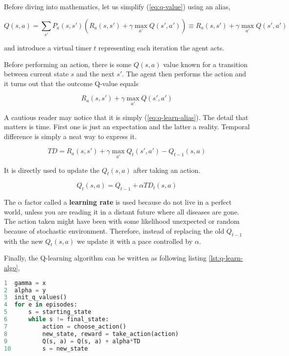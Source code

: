 Before diving into mathematics, let us simplify (\ref{eq:q-value}) using an alias,

\begin{equation}
    Q(s, a) = \sum_{s'} P_a(s, s') \left(R_a(s, s') + \gamma \max_{a'} Q(s', a') \right)
    \equiv
    R_a(s, s') + \gamma \max_{a'} Q(s', a')
\label{eq:q-learn-alias}
\end{equation}

and introduce a virtual timer $t$ representing each iteration the agent acts.

Before performing an action, there is some $Q(s, a)$ value known for a transition between current state $s$ and the next $s'$. The agent then performs the action and it turns out that the outcome Q-value equals 

\begin{equation}
    R_a(s, s') + \gamma \max_{a'} Q(s', a')
\end{equation}

A cautious reader may notice that it is simply (\ref{eq:q-learn-alias}). The detail that matters is time. First one is just an expectation and the latter a reality. Temporal difference is simply a neat way to express it.

\begin{equation}
    TD = R_a(s, s') + \gamma \max_{a'} Q_{t}(s', a') - Q_{t-1}(s, a)
\label{eq:temporal-difference}
\end{equation}

It is directly used to update the $Q_t(s, a)$ after taking an action.

\begin{equation}
    Q_t(s, a) = Q_{t-1} + \alpha TD_t(s, a)
\end{equation}

The $\alpha$ factor called a \textbf{learning rate} is used because do not live in a perfect world, unless you are reading it in a distant future where all diseases are gone. The action taken might have been with some likelihood unexpected or random because of stochastic environment. Therefore, instead of replacing the old $Q_{t-1}$ with the new $Q_t(s, a)$ we update it with a pace controlled by $\alpha$.

\newpage

Finally, the Q-learning algorithm can be written as following listing \ref{lst:q-learn-algo},

\begin{lstlisting}[language=Python, caption={Q-learning algorithm}, label={lst:q-learn-algo}]
1  gamma = x
2  alpha = y
3  init_q_values()
4  for e in episodes:
5      s = starting_state
6      while s != final_state:
7          action = choose_action()
8          new_state, reward = take_action(action)
9          Q(s, a) = Q(s, a) + alpha*TD
10         s = new_state
\end{lstlisting}


